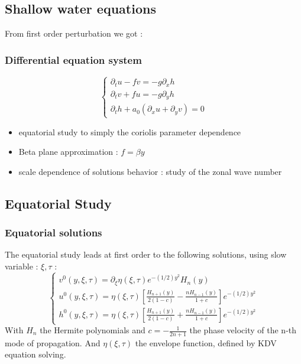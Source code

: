 \documentclass[numbering=fraction]{beamer}
\begin{document}
\subsection{Shallow water equations}
\begin{frame}
    From first order perturbation we got :
    \frametitle{Differential equation system}
    \begin{equation} \label{eq:1}
        \begin{cases}
            \partial_t u  - fv = -g \partial_x h \\
            \partial_t v + fu = -g \partial_y h  \\
            \partial_t h + a_0( \partial_x u + \partial_y v) = 0
        \end{cases}
    \end{equation}
    \begin{itemize}
        \item equatorial study to simply the coriolis parameter dependence
        \item Beta plane approximation  : $f = \beta y$
        \item scale dependence of solutions behavior : study of the zonal wave number
    \end{itemize}
\end{frame}
\subsection{Equatorial Study}
\begin{frame}
    \frametitle{Equatorial solutions}
    The equatorial study leads at first order to the following solutions,
    using slow variable : $\xi, \tau$ :
    \begin{equation}
        \label{eq:Rossby}
        \begin{cases}
            v^0(y, \xi, \tau) = \partial_\xi \eta(\xi, \tau) e^{-(1/2)y^2}H_n(y)                                     \\
            u^0(y, \xi, \tau) = \eta(\xi, \tau) [ \frac{H_{n+1}(y)}{2(1-c)} - \frac{nH_{n-1}(y)}{1 +c}]e^{-(1/2)y^2} \\
            h^0(y, \xi, \tau) = \eta(\xi, \tau) [ \frac{H_{n+1}(y)}{2(1-c)} + \frac{nH_{n-1}(y)}{1 +c }]e^{-(1/2)y^2}
        \end{cases}
    \end{equation}
    With $H_n$ the Hermite polynomials and $c = -   \frac{1}{2n + 1}$ the phase velocity of the n-th mode of propagation. And $\eta(\xi, \tau)$ the envelope function, defined by KDV equation solving.
\end{frame}
\end{document}
